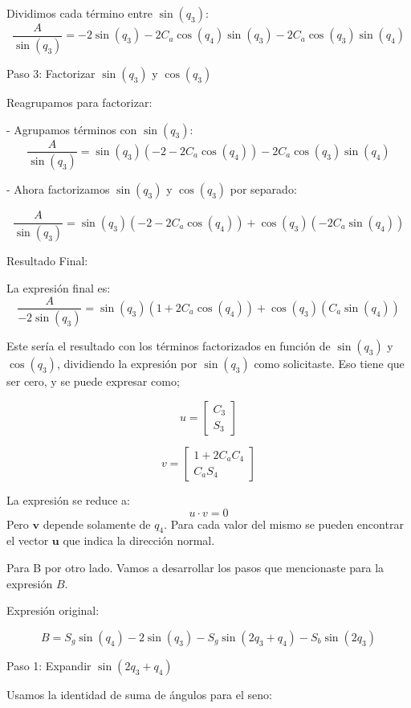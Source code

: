 \documentclass[a4paper,12pt]{article}
\begin{document}
Dividimos cada término entre \(\sin(q_3)\):
\[
\frac{A}{\sin(q_3)} = -2\sin(q_3) - 2C_a \cos(q_4)\sin(q_3) - 2C_a \cos(q_3)\sin(q_4)
\]

Paso 3: Factorizar \(\sin(q_3)\) y \(\cos(q_3)\)

Reagrupamos para factorizar:

- Agrupamos términos con \(\sin(q_3)\):
\[
\frac{A}{\sin(q_3)} = \sin(q_3)(-2 - 2C_a \cos(q_4)) - 2C_a \cos(q_3)\sin(q_4)
\]

- Ahora factorizamos \(\sin(q_3)\) y \(\cos(q_3)\) por separado:

\[
\frac{A}{\sin(q_3)} = \sin(q_3)(-2 - 2C_a \cos(q_4)) + \cos(q_3)(-2C_a \sin(q_4))
\]

Resultado Final:

La expresión final es:
\[
\frac{A}{-2\sin(q_3)} = \sin(q_3)(1 + 2C_a \cos(q_4)) + \cos(q_3)(C_a \sin(q_4))
\]

Este sería el resultado con los términos factorizados en función de \(\sin(q_3)\) y \(\cos(q_3)\), dividiendo la expresión por \(\sin(q_3)\) como solicitaste.
Eso tiene que ser cero, y se puede expresar como;

\begin{equation}
    u =
    \begin{bmatrix}
        C_3\\
        S_3
    \end{bmatrix}
\end{equation}

\begin{equation}
    v =
    \begin{bmatrix}
        1 + 2C_aC_4\\
        C_aS_4
    \end{bmatrix}
\end{equation}

La expresión se reduce a:
\[u \cdot v = 0\]
Pero $\mathbf{v}$ depende solamente de $q_4$. Para cada valor del mismo
se pueden encontrar el vector $\mathbf{u}$ que indica la dirección normal.

Para B por otro lado.
Vamos a desarrollar los pasos que mencionaste para la expresión \( B \).

 Expresión original:

\[
B = S_g \sin(q_4) - 2\sin(q_3) - S_g \sin(2q_3 + q_4) - S_b \sin(2q_3)
\]

 Paso 1: Expandir \(\sin(2q_3 + q_4)\)

Usamos la identidad de suma de ángulos para el seno:
\end{document}
